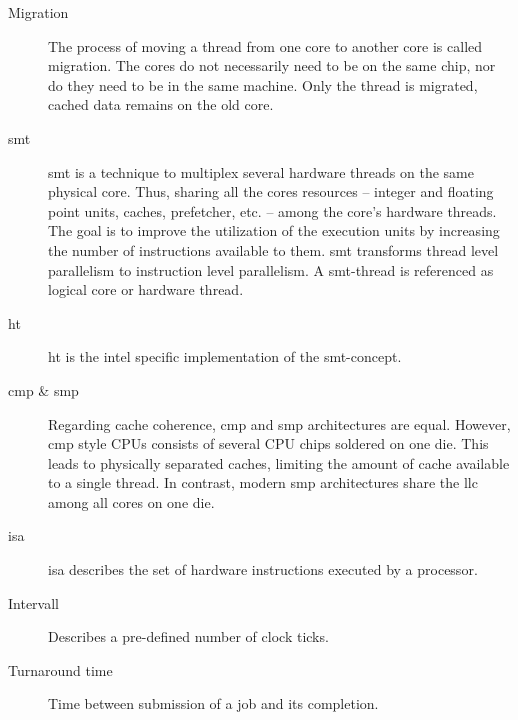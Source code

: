 \begin{description}
  \item[Migration] The process of moving a thread from one core to another core
    is called migration.
    The cores do not necessarily need to be on the same chip, nor do they need
    to be in the same machine. Only the thread is migrated, cached data remains
    on the old core.

  \item[\Gls{smt}] \gls{smt} is a technique to multiplex several hardware
    threads on the same physical core.
    Thus, sharing all the cores resources -- integer and floating point units,
    caches, prefetcher, etc. -- among the core's hardware threads.
    The goal is to improve the utilization of the execution units by increasing
    the number of instructions available to them.
    \gls{smt} transforms thread level parallelism to instruction level
    parallelism.
    A \gls{smt}-thread is referenced as logical core or hardware thread.

  \item[\Gls{ht}] \gls{ht} is the \gls{intel} specific implementation of the
    \gls{smt}-concept.

  \item[\Gls{cmp}  \& \Gls{smp}] Regarding cache coherence, \gls{cmp} and
    \gls{smp} architectures are equal.
    However, \gls{cmp} style CPUs consists of several CPU chips soldered on one
    die.
    This leads to physically separated caches, limiting the amount of cache
    available to a single thread.
    In contrast, modern \gls{smp} architectures share the \gls{llc} among all
    cores on one die.

  \item[\Gls{isa}]\gls{isa} describes the set of hardware instructions executed
    by a processor.

  \item[Intervall] Describes a pre-defined number of clock ticks.


  \item[Turnaround time] Time between submission of a job and its completion.





\end{description}
